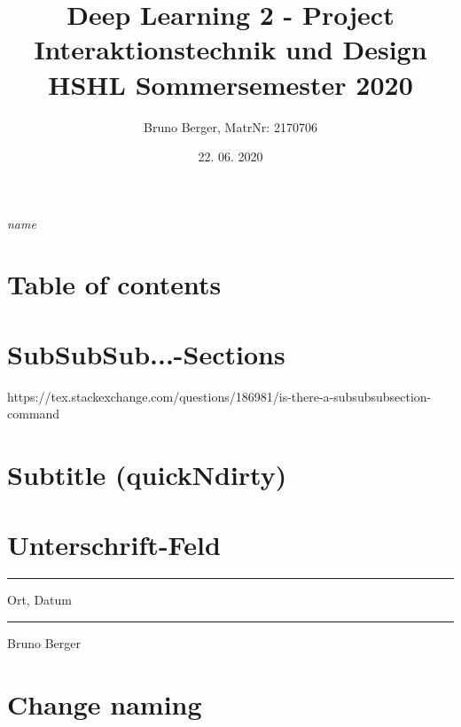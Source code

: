 \begin{flushright}
\emph{name}
\end{flushright}

\section{Table of contents}



\section{SubSubSub...-Sections}

https://tex.stackexchange.com/questions/186981/is-there-a-subsubsubsection-command


\section{Subtitle (quickNdirty)}

\title{Deep Learning 2 - Project\\
    \vspace{+14pt}
        \Large Interaktionstechnik und Design \\
        HSHL  Sommersemester 2020}
\author{Bruno Berger, MatrNr: 2170706}
\date{22. 06. 2020}


\section{Unterschrift-Feld}
\vfill
\parbox{5cm}{
\hrule
\strut Ort, Datum}
\hfill\parbox{6cm}
{\hrule \strut Bruno Berger}

\section{Change naming}
\renewcommand{\abstractname}{Vorwort}

\printbibliography[title = {Literature}]
